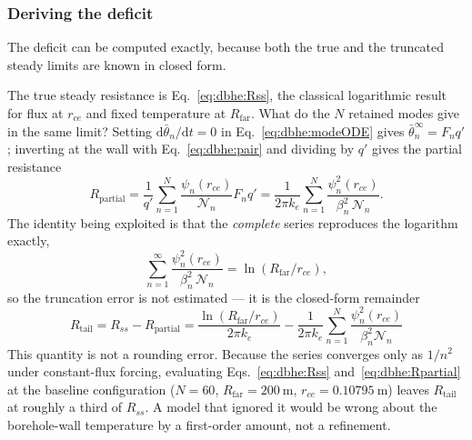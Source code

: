 \documentclass[11pt]{article}
\begin{document}
\subsubsection{Deriving the deficit}
The deficit can be computed exactly, because both the true and the truncated
steady limits are known in closed form.

The true steady resistance is Eq.~\eqref{eq:dbhe:Rss}, the classical logarithmic
result for flux at $r_{ce}$ and fixed temperature at $R_{\mathrm{far}}$. What do
the $N$ retained modes give in the same limit? Setting
$\mathrm{d}\bar\theta_n/\mathrm{d}t=0$ in Eq.~\eqref{eq:dbhe:modeODE} gives
$\bar\theta_n^{\infty}=F_n q'$; inverting at the wall with
Eq.~\eqref{eq:dbhe:pair} and dividing by $q'$ gives the partial resistance
\begin{equation}
R_{\mathrm{partial}} =\frac{1}{q'}\sum_{n=1}^{N}\frac{\psi_n(r_{ce})}{\mathcal{N}_n}F_n q'
=\frac{1}{2\pi k_e}\sum_{n=1}^{N} \frac{\psi_n^{2}(r_{ce})}{\beta_n^{2}\,\mathcal{N}_n} .
\label{eq:dbhe:Rpartial}
\end{equation}
The identity being exploited is that the \emph{complete} series reproduces the
logarithm exactly,
\begin{equation}
\sum_{n=1}^{\infty}\frac{\psi_n^{2}(r_{ce})}{\beta_n^{2}\,\mathcal{N}_n}
=\ln\!\left(R_{\mathrm{far}}/r_{ce}\right),
\label{eq:dbhe:sumid}
\end{equation}
so the truncation error is not estimated --- it is the closed-form remainder
\begin{equation}
\boxed{\; R_{\mathrm{tail}}=R_{ss}-R_{\mathrm{partial}}
=\frac{\ln(R_{\mathrm{far}}/r_{ce})}{2\pi k_e} -\frac{1}{2\pi
k_e}\sum_{n=1}^{N}\frac{\psi_n^{2}(r_{ce})}{\beta_n^{2}\mathcal{N}_n}\;}
\label{eq:dbhe:Rtail}
\end{equation}
This quantity is not a rounding error. Because the series converges only as
$1/n^{2}$ under constant-flux forcing, evaluating
Eqs.~\eqref{eq:dbhe:Rss} and~\eqref{eq:dbhe:Rpartial} at the baseline
configuration ($N=60$, $R_{\mathrm{far}}=\SI{200}{\metre}$,
$r_{ce}=\SI{0.10795}{\metre}$) leaves $R_{\mathrm{tail}}$ at roughly a third of
$R_{ss}$. A model that ignored it would be wrong about the borehole-wall
temperature by a first-order amount, not a refinement.
\end{document}
